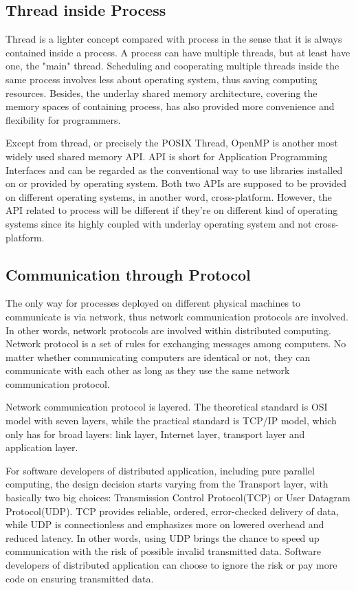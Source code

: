 \documentclass[12pt,a4]{report}
\begin{document}
\subsection{Thread inside Process}

Thread is a lighter concept compared with process in the sense that it is always contained inside a process. A process can have multiple threads, but at least have one, the "main" thread. Scheduling and cooperating multiple threads inside the same process involves less about operating system, thus saving computing resources. Besides, the underlay shared memory architecture, covering the memory spaces of containing process, has also provided more convenience and flexibility for programmers.

Except from thread, or precisely the POSIX Thread, OpenMP is another most widely used shared memory API. API is short for Application Programming Interfaces and can be regarded as the conventional way to use libraries installed on or provided by operating system. Both two APIs are supposed to be provided on different operating systems, in another word, cross-platform. However, the API related to process will be different if they're on different kind of operating systems since its highly coupled with underlay operating system and not cross-platform.

\subsection{Communication through Protocol}

The only way for processes deployed on different physical machines to communicate is via network, thus network communication protocols are involved. In other words, network protocols are involved within distributed computing. Network protocol is a set of rules for exchanging messages among computers. No matter whether communicating computers are identical or not, they can communicate with each other as long as they use the same network communication protocol.

Network communication protocol is layered. The theoretical standard is OSI model with seven layers, while the practical standard is TCP/IP model, which only has for broad layers: link layer, Internet layer, transport layer and application layer.

For software developers of distributed application, including pure parallel computing, the design decision starts varying from the Transport layer, with basically two big choices: Transmission Control Protocol(TCP) or User Datagram Protocol(UDP). TCP provides reliable, ordered, error-checked delivery of data, while UDP is connectionless and emphasizes more on lowered overhead and reduced latency. In other words, using UDP brings the chance to speed up communication with the risk of possible invalid transmitted data. Software developers of distributed application can choose to ignore the risk or pay more code on ensuring transmitted data.
\end{document}
